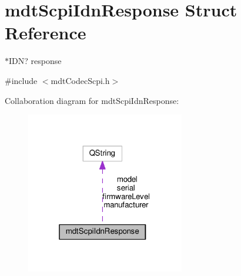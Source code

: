 \hypertarget{structmdt_scpi_idn_response}{\section{mdt\-Scpi\-Idn\-Response Struct Reference}
\label{structmdt_scpi_idn_response}
}


$\ast$\-I\-D\-N? response  




{\ttfamily \#include $<$mdt\-Codec\-Scpi.\-h$>$}



Collaboration diagram for mdt\-Scpi\-Idn\-Response\-:\nopagebreak
\begin{figure}[H]
\begin{center}
\leavevmode
\includegraphics[width=196pt]{structmdt_scpi_idn_response__coll__graph}
\end{center}
\end{figure}
